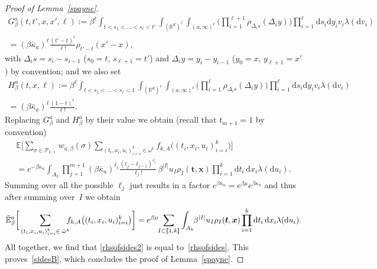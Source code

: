 \documentclass[JEP,XML,SOM,Unicode,published]{cedram}
\let\mathcal\mathscr
\newcommand{\lint}{\mathopen{[\![}}
\newcommand{\rint}{\mathclose{]\!]}}
\theoremstyle{definition}
\newcommand{\bt}{\boldsymbol{t}}
\newcommand{\bx}{\boldsymbol{x}}
\newcommand{\dd}{\mathrm{d}}
\newcommand{\cP}{{\ensuremath{\mathcal P}} }
\newcommand{\bbE}{{\ensuremath{\mathbb E}} }
\newcommand{\bbR}{{\ensuremath{\mathbb R}} }
\let\gb\beta
\let\go\omega
\begin{document}
\begin{proof}[Proof of Lemma~\ref{spayne}]
\begin{multline*}
G^{a}_{\beta}(t,t',x,x',\ell):=
\beta^{\ell} \int_{ t< s_1<\dots<s_{\ell}<t' } \int_{(\bbR^d)^{\ell}} \int_{(a,\infty)^\ell}
\biggl(\prod_{i=1}^{\ell+1}
\rho_{\Delta_i s}(\Delta_i y) \biggr)
\prod_{i=1}^{\ell} \dd s_i \dd y_i v_i \lambda(\dd v_i)
\\
=\left(\gb \bar \kappa_a\right)^{\ell}\frac{(t'-t)^{\ell}}{\ell!} \rho_{t'-t}(x'-x),
\end{multline*}
with $\Delta_i s = s_{i}-s_{i-1}$ ($s_0=t$, $s_{\ell+1}=t'$) and $\Delta_i y = y_{i}-y_{i-1}$ ($y_0=x$, $y_{\ell+1}=x'$) by convention;
and we also set\vspace*{-5pt}
\begin{multline*}
H^{a}_{\beta}(t,x, \ell):=
\beta^{\ell} \int_{ t< s_1<\dots<s_{\ell}<1} \int_{(\bbR^d)^{\ell}} \int_{(a,\infty)^\ell} \biggl(\prod_{i=1}^{\ell}
\rho_{\Delta_i s}(\Delta_i y) \biggr)
\prod_{i=1}^{\ell} \dd s_i \dd y_i v_i \lambda(\dd v_i)
\\[-8pt]
=\left(\gb \bar \kappa_a \right)^{\ell}\frac{(1-t)^\ell}{\ell!}.
\end{multline*}
Replacing $G_\gb^a$ and $H_{\gb}^a$ by their value we obtain (recall that $t_{m+1}=1$ by convention)\vspace*{-5pt}
\begin{multline*}
\bbE \bigg[ \sum_{\sigma\in \cP_{I,\ell} } w_{a,\beta}(\sigma)\sum_{(t_i,x_i,u_i)_{i=i}^k\in \go^k} f_{k,A}\bigl((t_i,x_i,u_i)_{i=i}^k \bigr) \bigg] \\[-3pt]
= e^{- \gb \kappa_a } \int_{A_k} \prod_{j=1}^{m+1}\left(\gb \bar \kappa_a \right)^{\ell_j}\frac{(t_{j}-t_{j-1})^{\ell_j}}{\ell_j! }\, \beta^{|I|} u_I \rho_I(\bt,\bx) \prod_{i=1}^k \dd t_i\,\dd x_i \lambda(\dd u_i).
\end{multline*}
Summing over all the possible $\ell_j$ just results in a factor $e^{\beta \bar \kappa_a} =e^{\gb \mu} e^{\gb \kappa_a}$ and thus after summing over~$I$
we obtain
\[
\tilde \bbE_{\gb}^{a} \bigg[ \sum_{(t_i,x_i,u_i)_{i=i}^k\in \; \hat \go^k}\hspace*{-2mm} f_{k,A} \bigl((t_i,x_i,u_i)_{i=i}^k \bigr) \bigg]
= e^{\beta \mu}\hspace*{-1mm} \sum_{I\subset \lint 1,k\rint}
\int_{A_k}\hspace*{-1mm} \beta^{|I|} u_I \rho_I(\bt,\bx) \prod_{i=1}^k \dd t_i\,\dd x_i \lambda(\dd u_i).
\]
All together, we find that \eqref{rhsofsides2} is equal to~\eqref{rhsofsides}. This proves~\eqref{sidesB},
which concludes the proof of Lemma~\ref{spayne}.
\end{proof}
\end{document}

